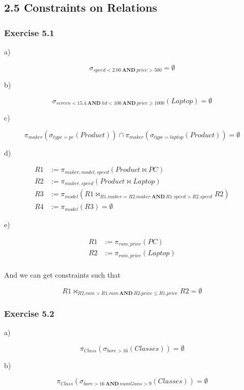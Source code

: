 \documentclass[../../main.tex]{subfiles}
\begin{document}
\subsection{2.5 Constraints on Relations}

\subsubsection*{Exercise 5.1}

a)

$$
\sigma_{speed < 2.00 \ \mathbf{AND} \ price > 500} = \emptyset
$$

b)

$$
\sigma_{screen < 15.4 \ \mathbf{AND} \ hd < 100 \ \mathbf{AND} \
price \geq 1000}(Laptop) = \emptyset$$

c)

$$
\pi_{maker}(\sigma_{type=pc}(Product))
\cap \pi_{maker}(\sigma_{type=laptop}(
Product)) = \emptyset
$$

d)

\begin{align*}
  R1 &:= \pi_{maker, model, speed}(Product \bowtie PC) \\
  R2 &:= \pi_{maker, speed}(Product \bowtie Laptop) \\
  R3 &:= \pi_{model}(R1 \bowtie_{R1.maker=R2.maker \ \mathbf{AND} \
         R1.speed > R2.speed} R2) \\
  R4 &:= \pi_{model}(R3) = \emptyset
\end{align*}

e)

\begin{align*}
  R1 &:= \pi_{ram, price}(PC) \\
  R2 &:= \pi_{ram, price}(Laptop) \\
\end{align*}

And we can get constraints such that

$$
R1 \bowtie_{R2.ram > R1.ram \ \mathbf{AND} \
R2.price \leq R1.price} R2 = \emptyset
$$

\subsubsection*{Exercise 5.2}

a)

$$
\pi_{Class}(\sigma_{bore > 16}(Classes))
= \emptyset
$$

b)

$$
\pi_{Class}(\sigma_{bore > 16
\ \mathbf{AND} \ numGuns > 9}(Classes))= \emptyset
$$
\end{document}
